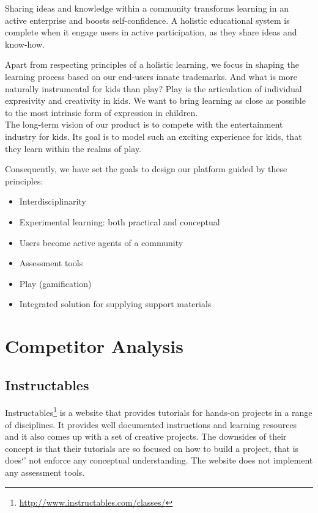 Sharing ideas and knowledge within a community transforms learning in an active enterprise and boosts self-confidence. A holistic educational system is complete when it engage users in active participation, as they share ideas and know-how.\\ 

Apart from respecting principles of a holistic learning, we focus in shaping the learning process based on our end-users innate trademarks. And what is more naturally instrumental for kids than play? Play is the articulation of individual expresivity and creativity in kids. We want to bring learning as close as possible to the most intrinsic form of expression in children.\\ 

The long-term vision of our product is to compete with the entertainment industry for kids. Its goal is to model such an exciting experience for kids, that they learn within the realms of play. \\ 


Consequently, we have set the goals to design our platform guided by these principles:
\begin{itemize}
\item Interdisciplinarity
\item Experimental learning: both practical and conceptual
\item Users become active agents of a community 
\item Assessment tools
\item Play (gamification)
\item Integrated solution for supplying support materials 
\end{itemize}


\section{Competitor Analysis}


\subsection{Instructables}

Instructables\footnote{\url{http://www.instructables.com/classes/}} is a website that provides tutorials for hands-on projects in a range of disciplines. It provides well documented instructions and learning resources and it also comes up with a set of creative projects.
The downsides of their concept is that their tutorials are so focused on how to build a project, that is does`' not enforce any conceptual understanding. The website does not implement any assessment tools.\\


